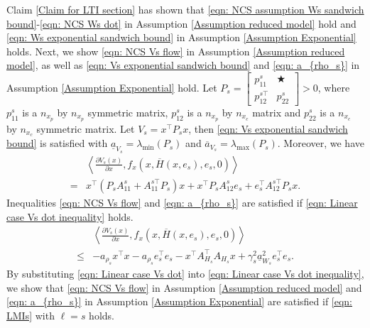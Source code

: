 Claim \ref{Claim for LTI section} has shown that \eqref{eqn: NCS assumption Ws sandwich bound}-\eqref{eqn: NCS Ws dot} in Assumption \ref{Assumption reduced model} hold and \eqref{eqn: Ws exponential sandwich bound} in Assumption \ref{Assumption Exponential} holds. 
%
Next, we show \eqref{eqn: NCS Vs flow} in Assumption \ref{Assumption reduced model}, as well as \eqref{eqn: Vs exponential sandwich bound} and \eqref{eqn: a_{rho_s}} in Assumption \ref{Assumption Exponential} hold.
%
Let $P_s = \left[\begin{smallmatrix}
    p_{11}^s  & \bigstar \\ {p_{12}^{s\top}} & p_{22}^s
\end{smallmatrix} \right] > 0$, where $p_{11}^s$ is a $n_{x_p} $ by $ n_{x_p}$ symmetric matrix, $p_{12}^s$ is a $n_{x_p} $ by $ n_{x_c}$ matrix and $p_{22}^s$ is a $n_{x_c} $ by $ n_{x_c}$ symmetric matrix. Let $V_s = x^\top P_s x$, then \eqref{eqn: Vs exponential sandwich bound} is satisfied with $\underline{a}_{V_s} = \lambda_{\text{min}}(P_s)$ and $\overline{a}_{V_s} = \lambda_{\text{max}}(P_s)$. Moreover, we have
\begin{equation}
    \begin{aligned}
        &\left< \tfrac{\partial {V_s}(x)}{\partial x},f_x(x,\overline{H}(x,e_s),e_s, 0) \right>   \\
        =& x^\top (P_s A_{11}^s + A_{11}^{s\top} P_s) x + x^\top P_s A_{12}^s e_s + e_s^\top A_{12}^{s\top} P_s x .
    \end{aligned}
        \label{eqn: Linear case Vs dot}
\end{equation}
Inequalities \eqref{eqn: NCS Vs flow} and \eqref{eqn: a_{rho_s}} are satisfied if
\eqref{eqn: Linear case Vs dot inequality} holds.
\begin{equation}
    \begin{aligned}
        &\left< \tfrac{\partial {V_s}(x)}{\partial x},f_x(x,\overline{H}(x,e_s),e_s, 0) \right>   \\
        \leq & -a_{\rho_s} x^\top x - a_{\rho_s} e_s^\top e_s - x^\top A_{H_s}^\top A_{H_s} x  + \gamma_s^2 \underline{a}_{W_s}^2 e_s^\top e_s.
    \end{aligned}
    \label{eqn: Linear case Vs dot inequality}
\end{equation}
By substituting \eqref{eqn: Linear case Vs dot} into \eqref{eqn: Linear case Vs dot inequality}, we show that \eqref{eqn: NCS Vs flow} in Assumption \ref{Assumption reduced model} and \eqref{eqn: a_{rho_s}} in Assumption \ref{Assumption Exponential} are satisfied if \eqref{eqn: LMIs} with $\ell = s$ holds.


